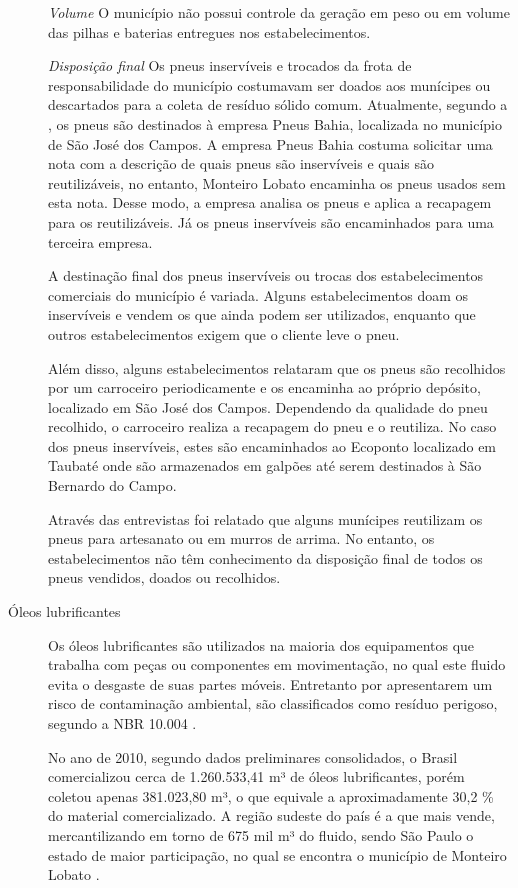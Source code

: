 \begin{description}
	\subitem \textit{Volume}
	O município não possui controle da geração em peso ou em volume das pilhas e baterias entregues nos estabelecimentos.
	
	\subitem \textit{Disposição final}
	Os pneus inservíveis e trocados da frota de responsabilidade do município costumavam ser doados aos munícipes ou descartados para a coleta de resíduo sólido comum. Atualmente, segundo a , os pneus são destinados à empresa Pneus Bahia, localizada no município de São José dos Campos. A empresa Pneus Bahia costuma solicitar uma nota com a descrição de quais pneus são inservíveis e quais são reutilizáveis, no entanto, Monteiro Lobato encaminha os pneus usados sem esta nota. Desse modo, a empresa analisa os pneus e aplica a recapagem para os reutilizáveis. Já os pneus inservíveis são encaminhados para uma terceira empresa.
	
	A destinação final dos pneus inservíveis ou trocas dos estabelecimentos comerciais do município é variada. Alguns estabelecimentos doam os inservíveis e vendem os que ainda podem ser utilizados, enquanto que outros estabelecimentos exigem que o cliente leve o pneu. 
	
	Além disso, alguns estabelecimentos relataram que os pneus são 
	recolhidos por um carroceiro periodicamente e os encaminha ao próprio depósito, localizado em São José dos Campos. Dependendo da qualidade do pneu recolhido, o carroceiro realiza a recapagem do pneu e o reutiliza. No caso dos pneus inservíveis, estes são encaminhados ao Ecoponto localizado em Taubaté onde são armazenados em galpões até serem destinados à São Bernardo do Campo.
	
	Através das entrevistas foi relatado que alguns munícipes reutilizam os pneus para artesanato ou em murros de arrima. No entanto, os estabelecimentos não têm conhecimento da disposição final de todos os pneus vendidos, doados ou recolhidos.
	
	
	\item[Óleos lubrificantes]	Os óleos lubrificantes são utilizados na maioria dos equipamentos que trabalha com peças ou componentes em movimentação, no qual este fluido evita o desgaste de suas partes móveis. Entretanto por apresentarem um risco de contaminação ambiental, são classificados como resíduo perigoso, segundo a NBR 10.004 \cite{ABNT:10004}. 
	
	No ano de 2010, segundo dados preliminares consolidados, o Brasil comercializou cerca de 1.260.533,41 m³ de óleos lubrificantes, porém coletou apenas 381.023,80 m³, o que equivale a aproximadamente 30,2 \% do material comercializado. A região sudeste do país é a que mais vende, mercantilizando em torno de 675 mil m³ do fluido, sendo São Paulo o estado de maior participação, no qual se encontra o município de Monteiro Lobato \cite{IPEA2012d}. 
	

\end{description}
